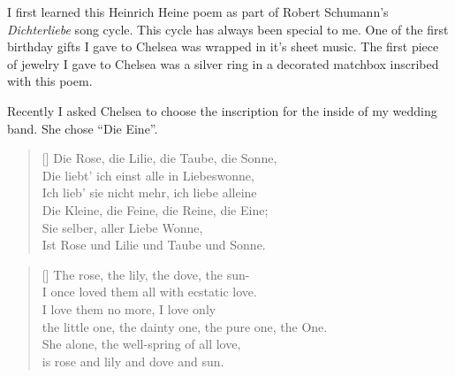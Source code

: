 \documentclass{article}
\begin{document}
\begin{multicols}{2}
    \columnbreak
    
    

     I first learned this
    Heinrich Heine poem as part of Robert Schumann's {\it Dichterliebe} song
    cycle. This cycle has always been special to me. One of the first birthday
    gifts I gave to Chelsea was wrapped in it's sheet music. The first piece of
    jewelry I gave to Chelsea was a silver ring in a decorated matchbox
    inscribed with this poem.

    Recently I asked Chelsea to choose the inscription for the inside of my
    wedding band. She chose ``Die Eine''.

    \settowidth{\versewidth}{the little one, the dainty one, the pure one, the One.}
    \begin{verse}[\versewidth]
    Die Rose, die Lilie, die Taube, die Sonne,\\
    Die liebt' ich einst alle in Liebeswonne,\\
    Ich lieb' sie nicht mehr, ich liebe alleine\\
    Die Kleine, die Feine, die Reine, die Eine;\\
    Sie selber, aller Liebe Wonne,\\
    Ist Rose und Lilie und Taube und Sonne.\\
    \end{verse}
    \settowidth{\versewidth}{the little one, the dainty one, the pure one, the One.}
    \begin{verse}[\versewidth]
    The rose, the lily, the dove, the sun-\\
    I once loved them all with ecstatic love.\\
    I love them no more, I love only\\
    the little one, the dainty one, the pure one, the One.\\
    She alone, the well-spring of all love,\\
    is rose and lily and dove and sun.\\
    \end{verse}

    \columnbreak
    \pagebreak
    
    \closearticle
    
    \columnbreak
    \begin{multicols}{2}
        
    \end{multicols}
\end{multicols}
\pagebreak


    
\end{document}
